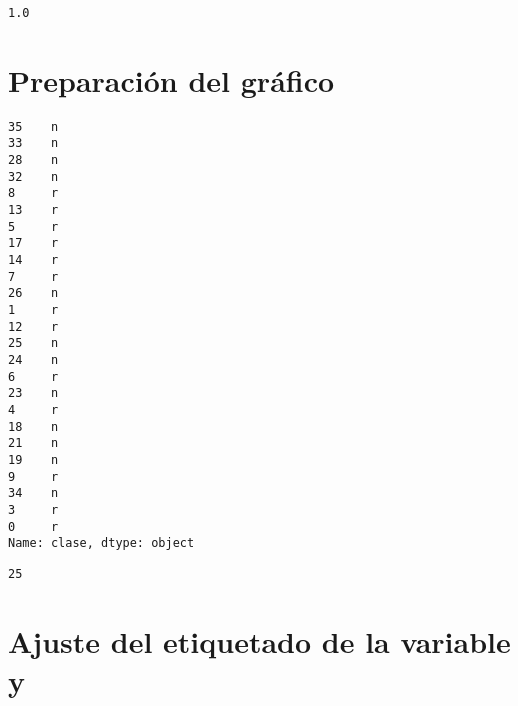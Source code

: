 \begin{verbatim}
1.0
\end{verbatim}

\section{Preparación del gráfico}


\begin{Shaded}
\begin{Highlighting}[]
\end{Highlighting}
\end{Shaded}


\begin{Shaded}
\begin{Highlighting}[]
\end{Highlighting}
\end{Shaded}


\begin{Shaded}
\begin{Highlighting}[]
\end{Highlighting}
\end{Shaded}

\begin{verbatim}
35    n
33    n
28    n
32    n
8     r
13    r
5     r
17    r
14    r
7     r
26    n
1     r
12    r
25    n
24    n
6     r
23    n
4     r
18    n
21    n
19    n
9     r
34    n
3     r
0     r
Name: clase, dtype: object
\end{verbatim}


\begin{Shaded}
\begin{Highlighting}[]
\end{Highlighting}
\end{Shaded}

\begin{verbatim}
25
\end{verbatim}


\section{Ajuste del etiquetado de la variable y}


\begin{Shaded}
\begin{Highlighting}[]
\end{Highlighting}
\end{Shaded}


